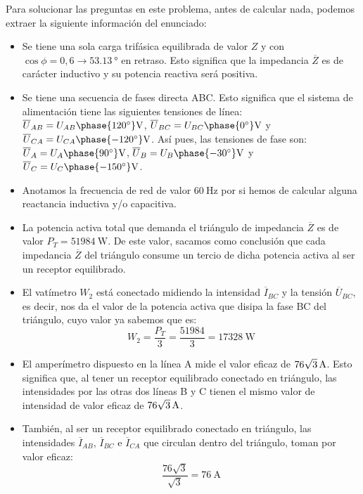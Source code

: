Para solucionar las preguntas en este problema, antes de calcular
nada, podemos extraer la siguiente información del enunciado:
\begin{itemize} %
\item Se tiene una sola carga trifásica equilibrada de valor $Z$ y con
  $\cos{\phi}=0,6\rightarrow \qty{53.13}{\degree}$ en retraso. Esto
  significa que la impedancia $\overline{Z}$ es de carácter inductivo
  y su potencia reactiva será positiva.
\item Se tiene una secuencia de fases directa ABC. Esto significa que
  el sistema de alimentación tiene las siguientes tensiones de línea:
  $\overline{U}_{AB}={U_{AB}\phase{\ang{120}}}\unit{\volt}$,
  $\overline{U}_{BC}={U_{BC}\phase{\ang{0}}}\unit{\volt}$
  y
  $\overline{U}_{CA}={U_{CA}\phase{\ang{-120}}}\unit{\volt}$. Así
  pues, las tensiones de fase son:
  $\overline{U}_{A}={U_{A}\phase{\ang{90}}}\unit{\volt}$,
  $\overline{U}_{B}={U_{B}\phase{\ang{-30}}}\unit{\volt}$
  y
  $\overline{U}_{C}={U_{C}\phase{\ang{-150}}}\unit{\volt}$.
\item Anotamos la frecuencia de red de valor $\qty{60}{\hertz}$ por si
  hemos de calcular alguna reactancia inductiva y/o capacitiva.
\item La potencia activa total que demanda el triángulo de impedancia
  $\overline{Z}$ es de valor $P_T=\qty{51984}{\watt}$. De este valor,
  sacamos como conclusión que cada impedancia $\overline{Z}$ del
  triángulo consume un tercio de dicha potencia activa al ser un
  receptor equilibrado.
\item El vatímetro $W_2$ está conectado midiendo la intensidad
  $\overline{I}_{BC}$ y la tensión $\overline{U}_{BC}$, es decir, nos
  da el valor de la potencia activa que disipa la fase BC del
  triángulo, cuyo valor ya sabemos que es:
  \[
    W_2=\dfrac{P_T}{3}=\dfrac{51984}{3}=\qty{17328}{\watt}
  \]
\item El amperímetro dispuesto en la línea A mide el valor eficaz de
  $\qty[parse-numbers=false]{76\sqrt{3}}{\ampere}$. Esto significa que,
  al tener un receptor equilibrado conectado en triángulo, las
  intensidades por las otras dos líneas B y C tienen el mismo valor de
  intensidad de valor eficaz de
  $\qty[parse-numbers=false]{76\sqrt{3}}{\ampere}$.
\item También, al ser un receptor equilibrado conectado en triángulo,
  las intensidades $\overline{I}_{AB}$, $\overline{I}_{BC}$ e
  $\overline{I}_{CA}$ que circulan dentro del triángulo, toman por
  valor eficaz:
  \[
    \dfrac{76\sqrt{3}}{\sqrt{3}}=\qty{76}{\ampere}
\]
\end{itemize}
